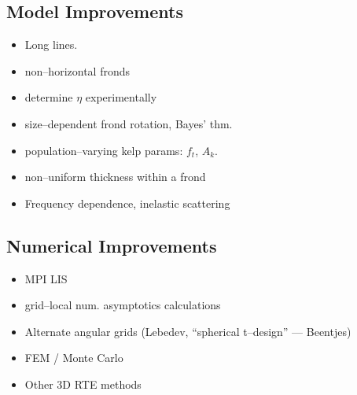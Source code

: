 \subsection{Model Improvements}
% 
% 
\begin{itemize}
  \item Long lines.
  \item non--horizontal fronds
  \item determine $\eta$ experimentally
  \item size--dependent frond rotation, Bayes' thm.
  \item population--varying kelp params: $f_t$, $A_k$.
  \item non--uniform thickness within a frond
  \item Frequency dependence, inelastic scattering
\end{itemize}

\subsection{Numerical Improvements}
\begin{itemize}
  \item MPI LIS
  \item grid--local num. asymptotics calculations
  \item Alternate angular grids (Lebedev, ``spherical t--design'' --- Beentjes)
  \item FEM / Monte Carlo
  \item Other 3D RTE methods
\end{itemize}

